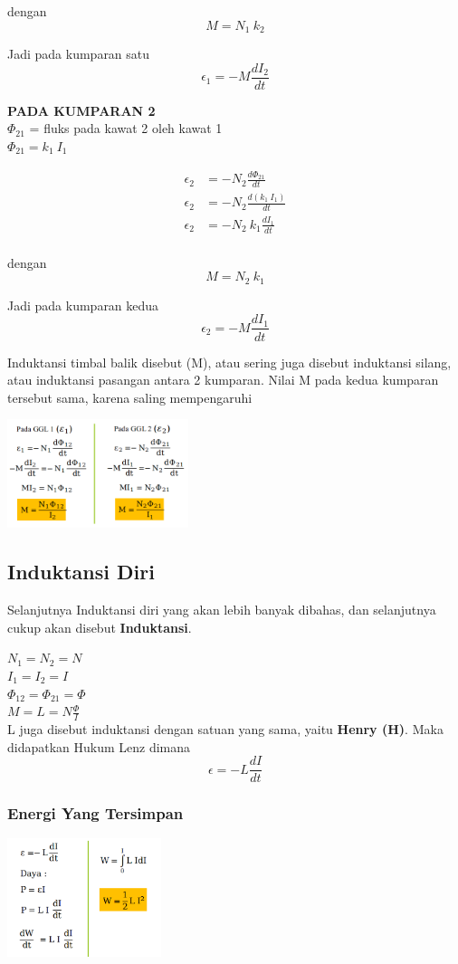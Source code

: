 \documentclass[twocolumn, 11pt]{article}%
\begin{document}
dengan
\[M=N_1\ k_2\]

Jadi pada kumparan satu
\[\epsilon_1 = -M \frac{dI_2}{dt} \]

\textbf{PADA KUMPARAN 2}\\
$\Phi_{21}$ = fluks pada kawat 2 oleh kawat 1\\
$\Phi_{21} = k_1\ I_1$

\begin{align*}
    \epsilon_2 &=-N_2 \frac{d\Phi_{21}}{dt}\\
    \epsilon_2 &=-N_2 \frac{d(k_1\ I_1)}{dt}\\
    \epsilon_2 &=-N_2\ k_1 \frac{dI_1}{dt}\\
\end{align*}

dengan
\[M=N_2\ k_1\]

Jadi pada kumparan kedua
\[\epsilon_2 = -M \frac{dI_1}{dt} \]

Induktansi timbal balik disebut (M), atau sering juga disebut induktansi
silang, atau induktansi pasangan antara 2 kumparan. Nilai M pada kedua
kumparan tersebut sama, karena saling mempengaruhi

\includegraphics[width=200px]{2.png}

\subsection{Induktansi Diri}%
Selanjutnya Induktansi diri yang akan lebih banyak dibahas, dan
selanjutnya cukup akan disebut \textbf{Induktansi}.

$N_1=N_2=N$\\
$I_1=I_2=I$\\
$\Phi_{12}=\Phi_{21}=\Phi$\\
$\displaystyle M=L=N\frac{\Phi}{I}$\\

L juga disebut induktansi dengan satuan yang sama, yaitu \textbf{Henry
(H)}. Maka didapatkan Hukum Lenz dimana
\[\epsilon=-L\frac{dI}{dt}\]

\subsubsection{Energi Yang Tersimpan}%
\begin{center}
    \includegraphics[width=170px]{3.png}
\end{center}
\end{document}
